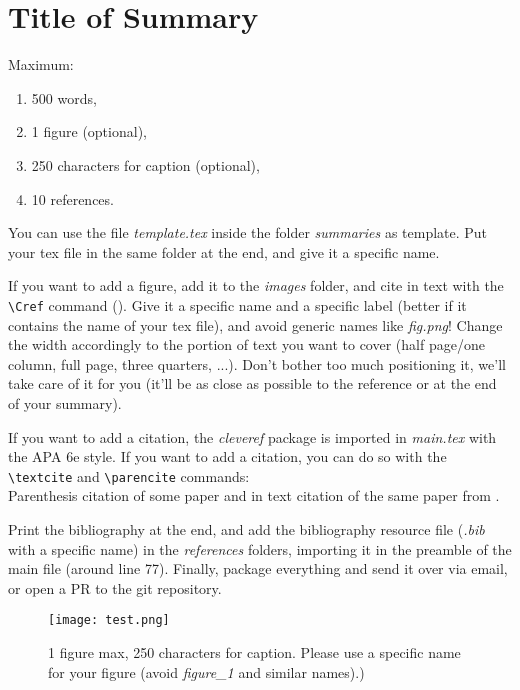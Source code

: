 \documentclass[../main.tex]{subfiles}
\begin{document}
\section{Title of Summary}



Maximum:
\begin{enumerate}
	\item 500 words,
	\item 1 figure (optional),
	\item 250 characters for caption (optional),
	\item 10 references.
\end{enumerate}

You can use the file \emph{template.tex} inside the folder \emph{summaries} as template. Put your tex file in the same folder at the end, and give it a specific name.

If you want to add a figure, add it to the \emph{images} folder, and cite in text with the \verb|\Cref| command (). Give it a specific name and a specific label (better if it contains the name of your tex file), and avoid generic names like \emph{fig.png}! Change the width accordingly to the portion of text you want to cover (half page/one column, full page, three quarters, ...). Don't bother too much positioning it, we'll take care of it for you (it'll be as close as possible to the reference or at the end of your summary).

If you want to add a citation, the \emph{cleveref} package is imported in \emph{main.tex} with the APA 6e style. If you want to add a citation, you can do so with the \verb|\textcite| and \verb|\parencite| commands: \\
Parenthesis citation of some paper \parencite{Gau2021} and in text citation of the same paper from \textcite{Gau2021}.

Print the bibliography at the end, and add the bibliography resource file (\emph{.bib} with a specific name) in the \emph{references} folders, importing it in the preamble of the main file (around line 77).
Finally, package everything and send it over via email, or open a PR to the git repository.

\begin{figure}
	\centering
	\texttt{[image: test.png]}
	\caption{1 figure max, 250 characters for caption. Please use a specific name for your figure (avoid \emph{figure_1} and similar names).)}
	\label{fig:test}
\end{figure}
\end{document}
